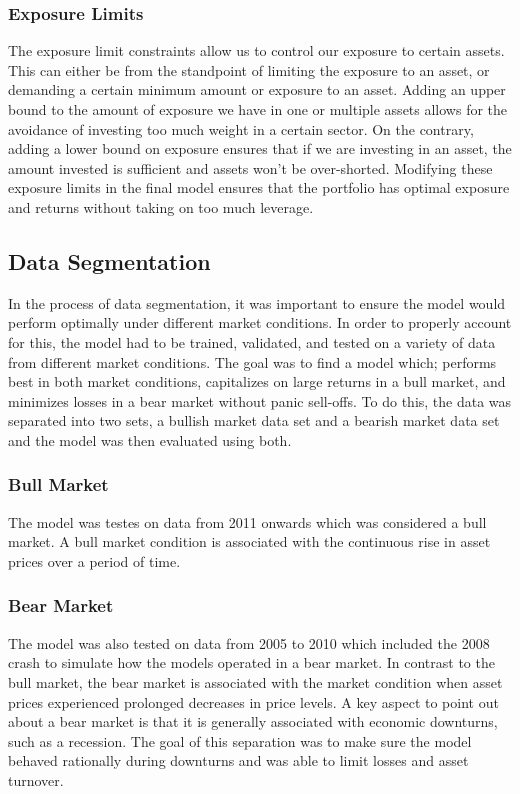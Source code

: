 \documentclass[10pt]{article}
\begin{document}
\subsubsection{Exposure Limits}
The exposure limit constraints allow us to control our exposure to certain assets. This can either be from the standpoint of limiting the exposure to an asset, or demanding a certain minimum amount or exposure to an asset. Adding an upper bound to the amount of exposure we have in one or multiple assets allows for the avoidance of investing too much weight in a certain sector. On the contrary, adding a lower bound on exposure ensures that if we are investing in an asset, the amount invested is sufficient and assets won't be over-shorted. Modifying these exposure limits in the final model ensures that the portfolio has optimal exposure and returns without taking on too much leverage.
\subsection{Data Segmentation}
In the process of data segmentation, it was important to ensure the model would perform optimally under different market conditions. In order to properly account for this, the model had to be trained, validated, and tested on a variety of data from different market conditions. The goal was to find a model which; performs best in both market conditions, capitalizes on  large returns in a bull market, and minimizes losses in a bear market without panic sell-offs. To do this, the data was separated into two sets, a bullish market data set and a bearish market data set and the model was then evaluated using both.
\subsubsection{Bull Market}
The model was testes on data from 2011 onwards which was considered a bull market. A bull market condition is associated with the continuous rise in asset prices over a period of time. 
\subsubsection{Bear Market}
The model was also tested on data from 2005 to 2010 which included the 2008 crash to simulate how the models operated in a bear market. In contrast to the bull market, the bear market is associated with the market condition when asset prices experienced prolonged decreases in price levels. A key aspect to point out about a bear market is that it is generally associated with economic downturns, such as a recession. The goal of this separation was to make sure the model behaved rationally during downturns and was able to limit losses and asset turnover. \pagebreak
\end{document}
